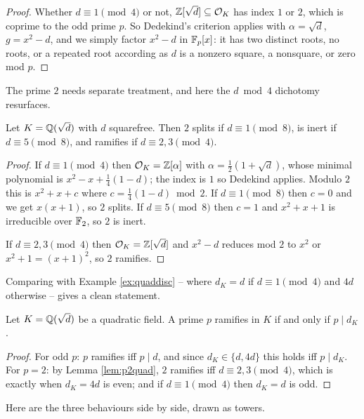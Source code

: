 \documentclass[a4paper]{scrartcl}
\renewcommand{\OO}{\mathcal{O}}
\begin{document}
\begin{proof}
	Whether $d \equiv 1 \pmod 4$ or not, $\Z[\sqrt d] \subseteq \OO_K$ has index $1$ or $2$, which is coprime to the odd prime $p$. So Dedekind's criterion applies with $\alpha = \sqrt d$, $g = x^2-d$, and we simply factor $x^2 - d$ in $\mathbb{F}_p[x]$: it has two distinct roots, no roots, or a repeated root according as $d$ is a nonzero square, a nonsquare, or zero mod $p$.
\end{proof}

The prime $2$ needs separate treatment, and here the $d \bmod 4$ dichotomy resurfaces.

\begin{lemma}\label{lem:p2quad}
	Let $K = \mathbb{Q}(\sqrt d)$ with $d$ squarefree. Then $2$ splits if $d \equiv 1 \pmod 8$, is inert if $d \equiv 5 \pmod 8$, and ramifies if $d \equiv 2,3\pmod 4$.
\end{lemma}

\begin{proof}
	If $d \equiv 1 \pmod 4$ then $\OO_K = \Z[\alpha]$ with $\alpha = \tfrac12(1+\sqrt d)$, whose minimal polynomial is $x^2 - x + \tfrac14(1-d)$; the index is $1$ so Dedekind applies. Modulo $2$ this is $x^2+x+c$ where $c = \tfrac14(1-d) \bmod 2$. If $d \equiv 1 \pmod 8$ then $c = 0$ and we get $x(x+1)$, so $2$ splits. If $d \equiv 5\pmod 8$ then $c = 1$ and $x^2+x+1$ is irreducible over $\mathbb{F}_2$, so $2$ is inert.

	If $d \equiv 2,3\pmod 4$ then $\OO_K = \Z[\sqrt d]$ and $x^2-d$ reduces mod $2$ to $x^2$ or $x^2+1 = (x+1)^2$, so $2$ ramifies.
\end{proof}

Comparing with Example \ref{ex:quaddisc} -- where $d_K = d$ if $d \equiv 1 \pmod 4$ and $4d$ otherwise -- gives a clean statement.

\begin{corollary}\label{cor:quadram}
	Let $K = \mathbb{Q}(\sqrt d)$ be a quadratic field. A prime $p$ ramifies in $K$ if and only if $p \mid d_K$.
\end{corollary}

\begin{proof}
	For odd $p$: $p$ ramifies iff $p \mid d$, and since $d_K \in \{d,4d\}$ this holds iff $p \mid d_K$. For $p = 2$: by Lemma \ref{lem:p2quad}, $2$ ramifies iff $d \equiv 2,3\pmod 4$, which is exactly when $d_K = 4d$ is even; and if $d \equiv 1\pmod 4$ then $d_K = d$ is odd.
\end{proof}

Here are the three behaviours side by side, drawn as towers.
\end{document}
